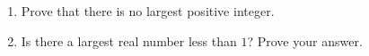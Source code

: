 \begin{enumerate}
\item[(a)] Prove that there is no largest positive integer.
\item[(b)] Is there a largest real number less than $1$? Prove your answer.
\end{enumerate}
